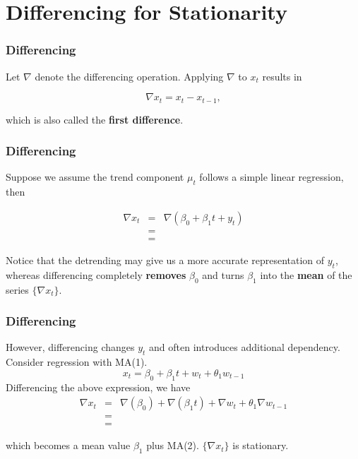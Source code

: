 \documentclass[%
xcolor=pdftex]{beamer}
\begin{document}
\section{Differencing for Stationarity}
\frame{\tableofcontents[currentsection]}




\begin{frame}
\frametitle{Differencing}

Let $\nabla$ denote the differencing operation. Applying $\nabla$ to $x_t$ results in

\begin{equation} \label{eq:first}
\nabla x_t = x_t-x_{t-1},
\end{equation}

which is also called the \textbf{first difference}.


\end{frame}

\begin{frame}
\frametitle{Differencing}

Suppose we assume the trend component $\mu_t$ follows a simple linear regression, then

\begin{eqnarray*}
\nabla x_t &=& \nabla (\beta_0 + \beta_1 t + y_t) \\
           &=&  \\
           &=&
\end{eqnarray*}

Notice that the detrending may give us a more accurate representation of $y_t$, whereas differencing completely \textbf{removes} $\beta_0$ and turns $\beta_1$ into the \textbf{mean} of the series $\{\nabla x_t \}$.

\end{frame}

\begin{frame}
\frametitle{Differencing}

However, differencing changes $y_t$ and often introduces
additional dependency. Consider regression with MA(1).
$$
x_t=\beta_0+\beta_1 t +w_t+\theta_1 w_{t-1}
$$
Differencing the above expression, we have
\begin{eqnarray*}
\nabla x_t &=& \nabla (\beta_0)  + \nabla(\beta_1 t) + \nabla w_t + \theta_1 \nabla w_{t-1} \\
           &=& \\
           &=&
\end{eqnarray*}

which becomes a mean value $\beta_1$ plus MA(2). $\{\nabla x_t \}$ is stationary.

\end{frame}
\end{document}
